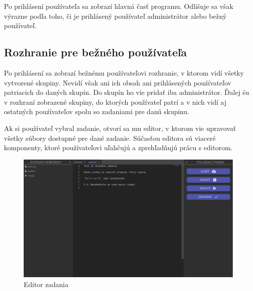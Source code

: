 Po prihlásení používateľa sa zobrazí hlavná časť programu. Odlišuje sa však výrazne podľa toho, či
je prihlásený používateľ administrátor alebo bežný používateľ.

\subsection{Rozhranie pre bežného používateľa}
Po prihlásení sa zobrazí bežnému používateľovi rozhranie, v ktorom vidí všetky vytvorené skupiny.
Nevidí však ani ich obsah ani prihlásených pouźívateľov patriacich do daných skupín. Do skupín
ho vie pridať iba administrátor. Ďalej śu v rozhraní zobrazené skupiny, do ktorých používateľ patrí
a v nich vidí aj ostatných pouźívateľov spolu so zadaniami pre danú skupinu.

Ak si používateľ vybral zadanie, otvorí sa mu editor, v ktorom vie upravovať všetky súbory dostupné
pre dané zadanie. Súčasťou editora sú viaceré komponenty, ktoré používateľovi uľahčujú a
zprehľadňujú prácu s editorom. 
\begin{figure}[H]
\centerline{\includegraphics[width=1\textwidth]{images/bezny_pouzivatel}}
\caption[Editor zadania]{Editor zadania}
\label{obr:bezny_pouzivatel}
\end{figure}

